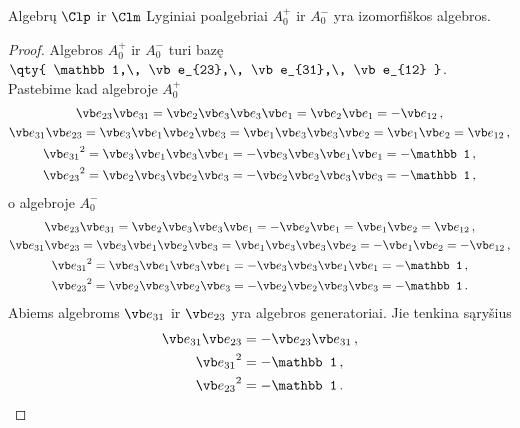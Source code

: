 \begin{proposition}
	\label{prop:even_iso}
	Algebrų $\Clp$ ir $\Clm$
	Lyginiai poalgebriai $A^+_0$ ir $A^-_0$ yra izomorfiškos algebros.
\end{proposition}

\begin{proof}
Algebros $A_0^+$ ir $A_0^-$ turi bazę $\qty{
		\mathbb 1,\, 
		\vb e_{23},\,
		\vb e_{31},\,
		\vb e_{12}
	}$. 
Pastebime kad algebroje $A_0^+$
\begin{gather}
	\vb e_{23} \vb e_{31} 
	= \vb e_2 \vb e_3 \vb e_3 \vb e_1
	= \vb e_2 \vb e_1
	= - \vb e_{12}
	\,,
\\
	\vb e_{31} \vb e_{23} 
	= \vb e_3 \vb e_1 \vb e_2 \vb e_3
	= \vb e_1 \vb e_3 \vb e_3 \vb e_2
	= \vb e_1 \vb e_2
	= \vb e_{12}
	\,,
\\
	{\vb e_{31}}^2 
	= \vb e_3 \vb e_1 \vb e_3 \vb e_1 
	= - \vb e_3 \vb e_3 \vb e_1 \vb e_1 
	= - \mathbb 1
	\,,
\\
	{\vb e_{23}}^2 
	= \vb e_2 \vb e_3 \vb e_2 \vb e_3 
	= - \vb e_2 \vb e_2 \vb e_3 \vb e_3 
	= - \mathbb 1
	\,,
\end{gather}
o algebroje $A_0^-$
\begin{gather}
	\vb e_{23} \vb e_{31} 
	= \vb e_2 \vb e_3 \vb e_3 \vb e_1 
	= - \vb e_2 \vb e_1 
	= \vb e_1 \vb e_2 
	= \vb e_{12}
	\,,
\\
	\vb e_{31} \vb e_{23} 
	= \vb e_3 \vb e_1 \vb e_2 \vb e_3
	= \vb e_1 \vb e_3 \vb e_3 \vb e_2
	= - \vb e_1 \vb e_2
	= - \vb e_{12}
	\,,
\\
	{\vb e_{31}}^2 
	= \vb e_3 \vb e_1 \vb e_3 \vb e_1 
	= - \vb e_3 \vb e_3 \vb e_1 \vb e_1 
	= - \mathbb 1
	\,,
\\
	{\vb e_{23}}^2 
	= \vb e_2 \vb e_3 \vb e_2 \vb e_3 
	= - \vb e_2 \vb e_2 \vb e_3 \vb e_3 
	= - \mathbb 1
	\,.
\end{gather}
Abiems algebroms $\vb e_{31}$ ir $\vb e_{23}$ yra algebros generatoriai.
Jie tenkina sąryšius
\begin{equation}
	\begin{aligned}
		\vb e_{31} \vb e_{23} &= - \vb e_{23} \vb e_{31} \,,\\
		{\vb e_{31}}^2 &= - \mathbb1 \,,\\
		{\vb e_{23}}^2 &= - \mathbb1 \,.
	\end{aligned}
\end{equation}


\end{proof}
